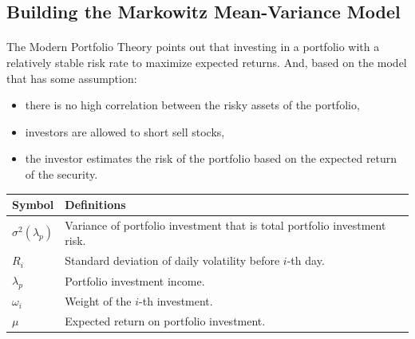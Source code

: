 \documentclass[12pt]{article}
\begin{document}
\subsection{Building the Markowitz Mean-Variance Model}
\paragraph{}
The Modern Portfolio Theory \cite{ref3} points out that investing in a portfolio with a relatively stable risk rate to maximize expected returns. And, based on the model that has some assumption:

\begin{itemize}
    \item there is no high correlation between the risky assets of the portfolio,
    \item investors are allowed to short sell stocks,
    \item the investor estimates the risk of the portfolio based on the expected return of the security.
\end{itemize}

\begin{table}
    \begin{center}
    \begin{tabular}{p{80pt}p{280pt}}
    \toprule
    Symbol       & Definitions \\
    \midrule
    $\sigma^2(\lambda_p)$       &  Variance of portfolio investment that is total portfolio investment risk. \\
    $R_i$    & Standard deviation of daily volatility before $i$-th day. \\
    $\lambda_p$     & Portfolio investment income. \\
    $\omega_i$& Weight of the $i$-th investment. \\
    $\mu$& Expected return on portfolio investment.\\
    \bottomrule 
    \end{tabular}
    \end{center}
    \end{table}
\end{document}
